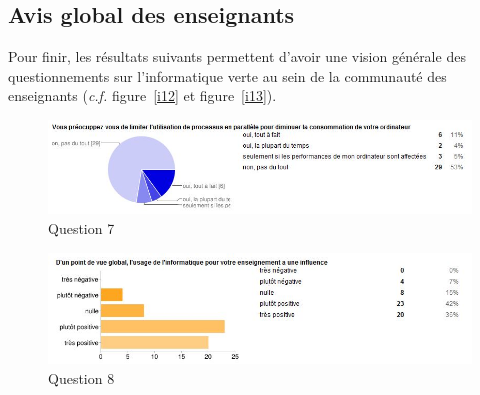\documentclass[a4paper,11pt,french]{report}
\begin{document}
\subsection{Avis global des enseignants}

Pour finir, les résultats suivants permettent d'avoir une vision générale des questionnements sur l'informatique verte au sein de la communauté des enseignants (\textit{c.f.} figure~\vref{i12} et figure~\vref{i13}).\\

\begin{figure}[h!]
\includegraphics[width=\textwidth]{i12.JPG}
\caption{Question 7}
\label{i12}
\end{figure}

\begin{figure}[h!]
\includegraphics[width=\textwidth]{i13.JPG}
\caption{Question 8}
\label{i13}
\end{figure}
\end{document}
